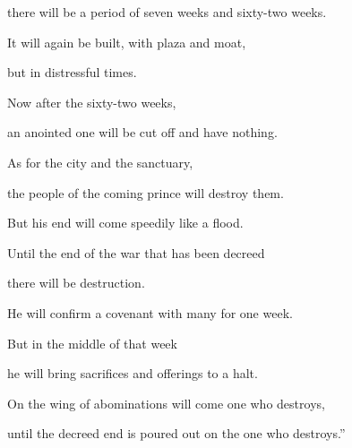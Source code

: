 {\par }{\Q there will be a period of seven
weeks
and sixty-two
weeks.
\par }{\Q It will again
be built,
with plaza
and moat,
\par }{\Q but in distressful
times.
\par }{\Q {}Now after
the sixty-two
weeks,
\par }{\Q an anointed one
will be cut off
and have nothing.
\par }{\Q As for the city
and the sanctuary,
\par }{\Q the people
of the coming
prince
will destroy
them.
\par }{\Q But his end
will come speedily like a flood.
\par }{\Q Until
the end
of the war
that has been decreed
\par }{\Q there will be destruction.
\par }{\Q {}He will confirm
a covenant
with many
for one
week.
\par }{\Q But in the middle
of that week
\par }{\Q he will bring
sacrifices
and offerings
to a halt.
\par }{\Q On
the wing
of abominations
will come one who destroys,
\par }{\Q until
the decreed
end
is poured out
on
the one who destroys.”

}
